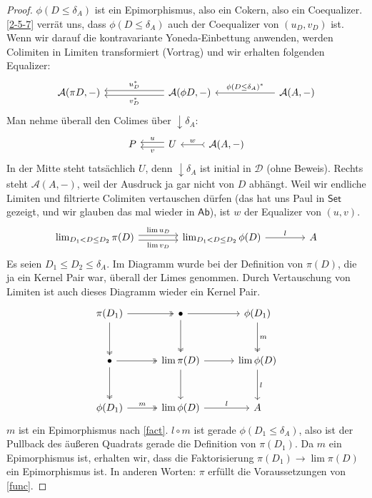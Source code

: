 \documentclass[a4paper, parskip=half,11pt]{scrartcl}
\theoremstyle{marginbreak}
\theoremstyle{nonumberplain}
\newtheorem{proof}{Beweis.}
\newcommand\ccat\mathsf
\newcommand\cat\mathcal
\newcommand{\down}[1]{{\downarrow}#1}
\newcommand{\n}{\pgfmatrixnextcell}
\begin{document}
{\begin{proof}
			$\phi(D\leq\delta_A)$ ist ein Epimorphismus, also ein Cokern, also ein
			Coequalizer. \ref{2-5-7} verrät uns, dass $\phi(D\leq\delta_A)$ auch der
			Coequalizer von $(u_D, v_D)$ ist. Wenn wir darauf die kontravariante
			Yoneda-Einbettung anwenden, werden Colimiten in Limiten transformiert
			(Vortrag) und wir erhalten folgenden Equalizer:
			\[
				\begin{tikzcd}[column sep=6em]
					\cat{A}(\pi D,{-}) \n
					\cat{A}(\phi D, {-})
						\ar[shift right, ']{l}{u_D^*}
						\ar[shift left]{l}{v_D^*} \n
					\cat{A}(A, {-})
						\ar[']{l}{\phi(D\leq\delta_A)^*}
				\end{tikzcd}
			\]
			Man nehme überall den Colimes über $\down{\delta_A}$:
			\[
				\begin{tikzcd}
					P \n
					U
						\ar[shift right, ']{l}{u}
						\ar[shift left]{l}{v} \n
					\cat{A}(A,{-})
						\ar[tail,']{l}{w}
				\end{tikzcd}
			\]
			In der Mitte steht tatsächlich $U$, denn $\down{\delta_A}$ ist
			initial in $\cat{D}$ (ohne Beweis). Rechts steht
			$\cat{A}(A,{-})$, weil der Ausdruck ja gar nicht von $D$ abhängt.
			Weil wir endliche Limiten und filtrierte Colimiten vertauschen dürfen
			(das hat uns Paul in $\ccat{Set}$ gezeigt, und wir glauben das mal wieder
			in $\ccat{Ab}$), ist $w$ der Equalizer von $(u, v)$.
			\[
				\begin{tikzcd}[column sep=4em]
					\lim_{D_1<D\leq D_2}\pi(D)
						\ar[shift left]{r}{\lim u_D}
						\ar[shift right, ']{r}{\lim v_D} \n
					\lim_{D_1<D\leq D_2}\phi(D)
						\ar{r}{l} \n
					A
				\end{tikzcd}
			\]
			Es seien $D_1\leq D_2\leq\delta_A$. Im Diagramm wurde bei der Definition
			von $\pi(D)$, die ja ein Kernel Pair war, überall der Limes genommen.
			Durch Vertauschung von Limiten ist auch dieses Diagramm wieder ein
			Kernel Pair.
			\[
				\begin{tikzcd}[sep=3em]
					\pi(D_1)
						\ar[two heads]{r}{}
						\ar[two heads]{d}{} \n
					\bullet
						\ar{r}{}
						\ar[two heads]{d}{} \n
					\phi(D_1)
						\ar[two heads]{d}{m} \\
					\bullet
						\ar[two heads]{r}{}
						\ar[two heads]{d}{} \n
					\lim\pi(D)
						\ar{r}{}
						\ar{d}{} \n
					\lim\phi(D)
						\ar{d}{l} \\
					\phi(D_1)
						\ar[two heads]{r}{m} \n
					\lim\phi(D)
						\ar{r}{l} \n
					A
				\end{tikzcd}
			\]
			$m$ ist ein Epimorphismus nach \ref{fact}. $l\circ m$ ist gerade
			$\phi(D_1\leq\delta_A)$, also ist der Pullback des äußeren Quadrats
			gerade die Definition von $\pi(D_1)$. Da $m$ ein Epimorphismus ist,
			erhalten wir, dass die Faktorisierung $\pi(D_1)\to\lim\pi(D)$ ein
			Epimorphismus ist. In anderen Worten: $\pi$ erfüllt die Voraussetzungen
			von \ref{func}.


\end{proof}}
\end{document}
